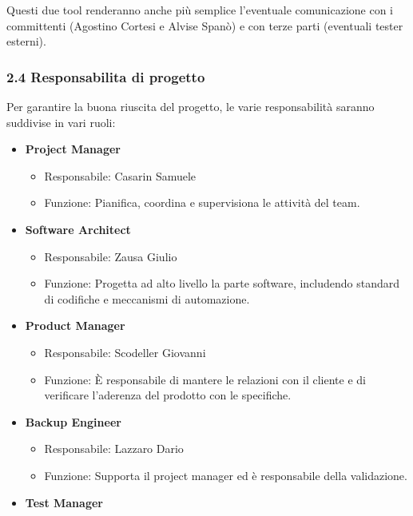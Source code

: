 \documentclass[]{article}
\providecommand{\tightlist}{%
  \setlength{\itemsep}{0pt}\setlength{\parskip}{0pt}}
\begin{document}
Questi due tool renderanno anche più semplice l'eventuale comunicazione
con i committenti (Agostino Cortesi e Alvise Spanò) e con terze parti
(eventuali tester esterni).

\hypertarget{responsabilita-di-progetto}{%
\subsubsection{2.4 Responsabilita di
progetto}\label{responsabilita-di-progetto}}

Per garantire la buona riuscita del progetto, le varie responsabilità
saranno suddivise in vari ruoli:

\begin{itemize}
\tightlist
\item
  \textbf{Project Manager}

  \begin{itemize}
  \tightlist
  \item
    Responsabile: Casarin Samuele
  \item
    Funzione: Pianifica, coordina e supervisiona le attività del team.
  \end{itemize}
\item
  \textbf{Software Architect}

  \begin{itemize}
  \tightlist
  \item
    Responsabile: Zausa Giulio
  \item
    Funzione: Progetta ad alto livello la parte software, includendo
    standard di codifiche e meccanismi di automazione.
  \end{itemize}
\item
  \textbf{Product Manager}

  \begin{itemize}
  \tightlist
  \item
    Responsabile: Scodeller Giovanni
  \item
    Funzione: È responsabile di mantere le relazioni con il cliente e di
    verificare l'aderenza del prodotto con le specifiche.
  \end{itemize}
\item
  \textbf{Backup Engineer}

  \begin{itemize}
  \tightlist
  \item
    Responsabile: Lazzaro Dario
  \item
    Funzione: Supporta il project manager ed è responsabile della
    validazione.
  \end{itemize}
\item
  \textbf{Test Manager}


\end{itemize}
\end{document}
